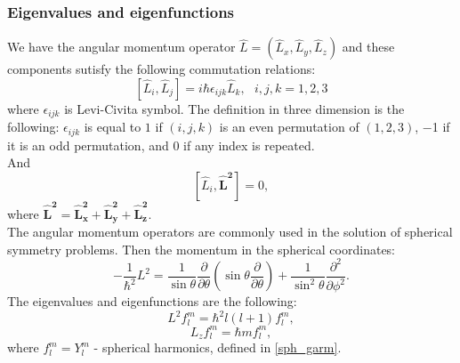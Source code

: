 \documentclass[a4paper, 11pt]{article}
\begin{document}
\subsubsection{Eigenvalues and eigenfunctions}
We have the angular momentum operator $\hat L = (\hat L_x,\hat L_y, \hat L_z)$ and these components sutisfy the following commutation relations:
\begin{equation}\label{comm_L}
	[\hat L_i, \hat L_j] =i \hbar \epsilon_{ijk}  \hat L_k, ~~~i, j, k =1,2,3
\end{equation}
where $\epsilon_{ijk}$ is Levi-Civita symbol. The definition in three dimension is the following:  $\epsilon_{ijk}$ is equal to $1$ if $(i, j, k)$ is an even permutation of $(1, 2, 3)$,  $-$1 if it is an odd permutation, and  $0$ if any index is repeated.\\
And 
$$[\hat L_i, \boldsymbol{\hat L^2}] = 0, $$
where $\mathbf{\hat L^2 = \hat L_x^2+\hat L_y^2+\hat L_z^2} .$\\
The angular momentum operators are commonly used in the solution of spherical symmetry problems. Then the momentum in the spherical coordinates: 
$$-\frac{1}{\hbar^2}L^2=\frac{1}{\sin \theta}\frac{\partial}{\partial \theta}(\sin \theta \frac{\partial}{\partial \theta})+\frac{1}{\sin^2 \theta}\frac{\partial^2}{\partial \phi^2}.$$
The eigenvalues and eigenfunctions are the following:
$$L^2 f_l^m = \hbar^2l(l+1) f_l^m,$$
$$L_z f_l^m = \hbar m f_l^m,$$
where $f_l^m = Y_l^m$ - spherical harmonics, defined in \eqref{sph_garm}.
\end{document}
